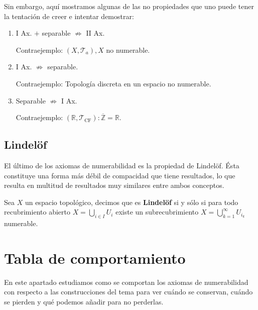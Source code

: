 \begin{obs}
Sin embargo, aquí mostramos algunas de las no propiedades que uno puede tener la tentación de creer e intentar demostrar:
\begin{enumerate}
    \item I Ax. $+$ separable $\not \Rightarrow$ II Ax.
    
    			Contraejemplo: $\left( X, \mathcal{T}_a \right), X$ no numerable.
    \item I Ax. $\not \Rightarrow$ separable.
    
    			Contraejemplo: Topología discreta en un espacio no numerable.
    \item Separable $\not \Rightarrow$ I Ax.
    
    			Contraejemplo: $\left( \mathbb{R}, \mathcal{T}_{\text{CF}} \right) : \overline{\mathbb{Z}} = \mathbb{R}$.
\end{enumerate}
\end{obs}

\subsection{Lindelöf}%
\label{sub:lindelof}
El último de los axiomas de numerabilidad es la propiedad de Lindelöf. Ésta constituye una forma más débil de compacidad que tiene resultados, lo que resulta en multitud de resultados muy similares entre ambos conceptos.

\begin{defi}[Lindelöf]
Sea $X$ un espacio topológico, decimos que es \textbf{Lindelöf} si y sólo si para todo recubrimiento abierto $X = \bigcup_{i \in I} U_i$ existe un subrecubrimiento $X = \bigcup_{k=1}^{\infty} U_{i_k}$ numerable.
\end{defi}

\section{Tabla de comportamiento}%
\label{sec:tabla_de_comportamiento_num}
En este apartado estudiamos como se comportan los axiomas de numerabilidad con respecto a las construcciones del tema  para ver cuándo se conservan, cuándo se pierden y qué podemos añadir para no perderlas.

